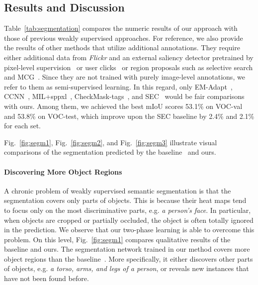 \documentclass[10pt,twocolumn,letterpaper]{article}
\newcommand{\figref}[1]{Fig.~\ref{#1}}
\newcommand{\tabfref}[1]{Table~\ref{#1}}
\begin{document}
\subsection{Results and Discussion}
\tabfref{tab:segmentation} compares the numeric results of our approach with those of previous weakly supervised approaches. For reference, we also provide the results of other methods that utilize additional annotations. They require either additional data from \textit{Flickr} and an external saliency detector pretrained by pixel-level supervision~\cite{Wei15stc} or user clicks~\cite{SalehASPGA16builtin} or region proposals such as selective search and MCG~\cite{Pinheiro2015CVPR}. Since they are not trained with purely image-level annotations, we refer to them as semi-supervised learning. In this regard, only EM-Adapt~\cite{Papandreou_2015_ICCV}, CCNN~\cite{pathakICCV15ccnn}, MIL+sppxl~\cite{Pinheiro2015CVPR}, CheckMask-tags~\cite{SalehASPGA16builtin}, and SEC~\cite{kolesnikov2016seed} would be fair comparisons with ours. %
Among them, we achieved the best mIoU scores 53.1\% on VOC-val and 53.8\% on VOC-test, which improve upon the SEC baseline by 2.4\% and 2.1\% for each set.

\figref{fig:segm1}, \figref{fig:segm2}, and \figref{fig:segm3} illustrate visual comparisons of the segmentation predicted by the baseline~\cite{kolesnikov2016seed} and ours.

\paragraph{Discovering More Object Regions}\quad A chronic problem of weakly supervised semantic segmentation is that the segmentation covers only parts of objects. This is because their heat maps tend to focus only on the most discriminative parts, e.g. \textit{a person's face}. %
In particular, when objects are cropped or partially occluded, the object is often totally ignored in the prediction.
We observe that our two-phase learning is able to overcome this problem. On this level, \figref{fig:segm1} compares qualitative results of the baseline and ours. The segmentation network trained in our method covers more object regions than the baseline~\cite{kolesnikov2016seed}. More specifically, it either discovers other parts of objects, e.g. \textit{a torso, arms, and legs of a person}, or reveals new instances that have not been found before.
\end{document}
